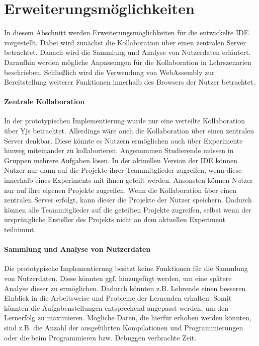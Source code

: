\section{Erweiterungsmöglichkeiten}\label{section:diskussion:erweiterungsmöglichkeiten}
In diesem Abschnitt werden Erweiterungsmöglichkeiten für die entwickelte IDE vorgestellt. Dabei wird zunächst die Kollaboration über einen zentralen Server betrachtet. Danach wird die Sammlung und Analyse von Nutzerdaten erläutert. Daraufhin werden mögliche Anpassungen für die Kollaboration in Lehrszenarien beschrieben. Schließlich wird die Verwendung von WebAssembly \cite{noauthor_webassembly_nodate} zur Bereitstellung weiterer Funktionen innerhalb des Browsers der Nutzer betrachtet.

\paragraph{Zentrale Kollaboration}
In der prototypischen Implementierung wurde nur eine verteilte Kollaboration über Yjs betrachtet. Allerdings wäre auch die Kollaboration über einen zentralen Server denkbar. Diese könnte es Nutzern ermöglichen auch über Experimente hinweg miteinander zu kollaborieren. Angenommen Studierende müssen in Gruppen mehrere Aufgaben lösen. In der aktuellen Version der IDE können Nutzer nur dann auf die Projekte ihrer Teammitglieder zugreifen, wenn diese innerhalb eines Experiments mit ihnen geteilt werden. Ansonsten können Nutzer nur auf ihre eigenen Projekte zugreifen. Wenn die Kollaboration über einen zentralen Server erfolgt, kann dieser die Projekte der Nutzer speichern. Dadurch können alle Teammitglieder auf die geteilten Projekte zugreifen, selbst wenn der ursprüngliche Ersteller des Projekts nicht an dem aktuellen Experiment teilnimmt.

\paragraph{Sammlung und Analyse von Nutzerdaten}
Die prototypische Implementierung besitzt keine Funktionen für die Sammlung von Nutzerdaten. Diese könnten ggf. hinzugefügt werden, um eine spätere Analyse dieser zu ermöglichen. Dadurch könnten z.B. Lehrende einen besseren Einblick in die Arbeitsweise und Probleme der Lernenden erhalten. Somit könnten die Aufgabenstellungen entsprechend angepasst werden, um den Lernerfolg zu maximieren. Mögliche Daten, die hierfür erhoben werden könnten, sind z.B. die Anzahl der ausgeführten Kompilationen und Programmierungen oder die beim Programmieren bzw. Debuggen verbrachte Zeit.

